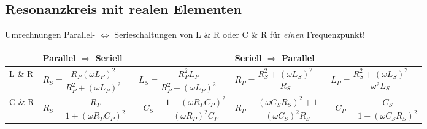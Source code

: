 \subsection{Resonanzkreis mit realen Elementen}
Umrechnungen Parallel- $\Longleftrightarrow$ Serieschaltungen von L \& R oder C
\& R für \textit{einen} Frequenzpunkt!\\

\renewcommand{\arraystretch}{1.1}
\begin{tabular}{| p{2cm} | p{8cm} | p{8cm} |}
	\hline
		& \textbf{Parallel $\Rightarrow$ Seriell}  
		& \textbf{Seriell $\Rightarrow$ Parallel} \\
	\hline
		L \& R
		& $ R_S = \dfrac{R_P (\omega L_P)^2}{R_P^2 + (\omega L_P)^2} \qquad 
			L_S = \dfrac{R_P^2 L_P}{R_P^2 + (\omega L_P)^2}  $
		& $ R_P = \dfrac{R_S^2 + (\omega L_S)^2}{R_S} \qquad 
			L_P = \dfrac{R_S^2 + (\omega L_S)^2}{\omega^2 L_S}   $ \\
	\hline	
		C \& R
		& $ R_S = \dfrac{R_P}{1 + (\omega R_P C_P)^2} \qquad 
			C_S = \dfrac{1 + (\omega R_P C_P)^2}{(\omega R_P)^2 C_P}$
		& $ R_P = \dfrac{(\omega C_S R_S)^2 + 1}{(\omega C_S)^2 R_S} \qquad
			C_P = \dfrac{C_S}{1 + (\omega C_S R_S)^2}$\\
	\hline
\end{tabular}
\renewcommand{\arraystretch}{1}

